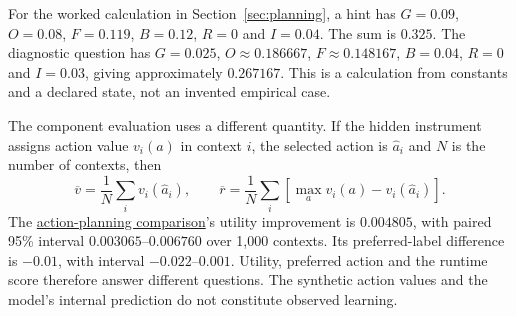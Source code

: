 For the worked calculation in Section~\ref{sec:planning}, a hint has
$G=0.09$, $O=0.08$, $F=0.119$, $B=0.12$, $R=0$ and $I=0.04$.
The sum is $0.325$. The diagnostic question has $G=0.025$,
$O\approx0.186667$, $F\approx0.148167$, $B=0.04$, $R=0$ and $I=0.03$,
giving approximately $0.267167$. This is a calculation from constants and a
declared state, not an invented empirical case.

The component evaluation uses a different quantity. If the hidden instrument
assigns action value $v_i(a)$ in context $i$, the selected action is $\hat a_i$
and $N$ is the number of contexts, then
\begin{equation}
\overline v=\frac1N\sum_i v_i(\hat a_i),\qquad
\overline r=\frac1N\sum_i\left[\max_a v_i(a)-v_i(\hat a_i)\right].
\end{equation}
The \hyperref[study-C]{action-planning comparison}'s utility improvement is $0.004805$, with paired 95\% interval
$0.003065$--$0.006760$ over 1,000 contexts. Its preferred-label difference
is $-0.01$, with interval $-0.022$--$0.001$. Utility, preferred action and
the runtime score therefore answer different questions. The synthetic action
values and the model's internal prediction do not constitute observed learning.
